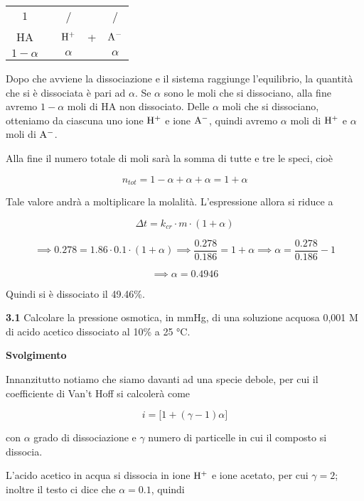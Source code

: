 \begin{center}
    \begin{tabular}{ccccc}
        $1$ & & / & & /\\
        HA & \ce{<-->} & $\rm H^+$ & + & $\rm A^-$\\
        $1 - \alpha$ &  &  $\alpha$ & & $\alpha$\\
    \end{tabular}
\end{center}

Dopo che avviene la dissociazione e il sistema raggiunge l'equilibrio, la quantità che si è dissociata è pari ad $\alpha$. Se $\alpha$ sono le moli che si dissociano, alla fine avremo $1-\alpha$ moli di HA non dissociato. Delle $\alpha$ moli che si dissociano, otteniamo da ciascuna uno ione $\rm H^+$ e ione $\rm A^-$, quindi avremo $\alpha$ moli di $\rm H^+$ e $\alpha$ moli di $\rm A^-$.

Alla fine il numero totale di moli sarà la somma di tutte e tre le speci, cioè

$$n_{tot}=1 - \alpha + \alpha + \alpha=1+\alpha$$

Tale valore andrà a moltiplicare la molalità. L'espressione allora si riduce a

$$\Delta t=k_{cr} \cdot m \cdot (1 + \alpha)$$

$$\implies
0.278 = 1.86 \cdot 0.1 \cdot (1+\alpha)
\implies
\frac{0.278}{0.186}= 1 + \alpha
\implies
\alpha=\frac{0.278}{0.186} - 1$$

$$\implies \alpha=0.4946$$

Quindi si è dissociato il 49.46\%.

\vspace{0.2cm}\textbf{3.1} Calcolare la pressione osmotica, in mmHg, di una soluzione acquosa 0,001 M di acido acetico dissociato al 10\% a 25 °C.

\vspace{0.2cm}\large\textbf{Svolgimento}\normalsize

\vspace{0.2cm}Innanzitutto notiamo che siamo davanti ad una specie debole, per cui il coefficiente di Van't Hoff si calcolerà come

$$i=\big[1 + (\gamma -1)\alpha\big]$$

con $\alpha$ grado di dissociazione e $\gamma$ numero di particelle in cui il composto si dissocia.

L'acido acetico in acqua si dissocia in ione $\rm H^+$ e ione acetato, per cui $\gamma=2$; inoltre il testo ci dice che $\alpha=0.1$, quindi

